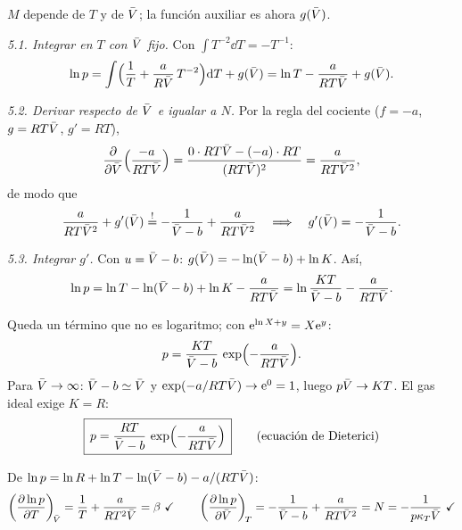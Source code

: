 \begin{resolucion}
 $M$ depende de $T$ y de $\bar{V}$; la función auxiliar es ahora $g(\bar{V})$.

\emph{5.1. Integrar en $T$ con $\bar{V}$ fijo.} Con $\int T^{-2}\dd T=-T^{-1}$:
\[
  \ln p=\int\Bigl(\frac1T+\frac{a}{R\bar{V}}\,T^{-2}\Bigr)\mathrm{d} T+g(\bar{V})=\ln T-\frac{a}{RT\bar{V}}+g(\bar{V}).
\]

\emph{5.2. Derivar respecto de $\bar{V}$ e igualar a $N$.} Por la regla del cociente ($f=-a$, $g=RT\bar{V}$,
$g'=RT$),
\[
  \frac{\partial}{\partial\bar{V}}\Bigl(\frac{-a}{RT\bar{V}}\Bigr)=\frac{0\cdot RT\bar{V}-(-a)\cdot RT}{(RT\bar{V})^2}=\frac{a}{RT\bar{V}^2},
\]
de modo que
\[
  \frac{a}{RT\bar{V}^2}+g'(\bar{V})\stackrel{!}{=}-\frac{1}{\bar{V}-b}+\frac{a}{RT\bar{V}^2}
  \quad\Longrightarrow\quad g'(\bar{V})=-\frac{1}{\bar{V}-b}.
\]

\emph{5.3. Integrar $g'$.} Con $u=\bar{V}-b$: $g(\bar{V})=-\ln(\bar{V}-b)+\ln K$. Así,
\[
  \ln p=\ln T-\ln(\bar{V}-b)+\ln K-\frac{a}{RT\bar{V}}=\ln\frac{KT}{\bar{V}-b}-\frac{a}{RT\bar{V}}.
\]

 Queda un término que no es logaritmo; con
$\mathrm{e}^{\ln X+y}=X\mathrm{e}^y$:
\[
  p=\frac{KT}{\bar{V}-b}\,\exp\Bigl(-\frac{a}{RT\bar{V}}\Bigr).
\]
Para $\bar{V}\to\infty$: $\bar{V}-b\simeq\bar{V}$ y $\exp(-a/RT\bar{V})\to\mathrm{e}^0=1$, luego $p\bar{V}\to KT$. El gas ideal exige
$K=R$:
\[
  \boxed{\,p=\frac{RT}{\bar{V}-b}\,\exp\Bigl(-\frac{a}{RT\bar{V}}\Bigr)\,}\qquad\text{(ecuación de Dieterici)}
\]

 De $\ln p=\ln R+\ln T-\ln(\bar{V}-b)-a/(RT\bar{V})$:
\[
  \left(\frac{\partial \ln p}{\partial T}\right)_{\!\bar{V}}=\frac1T+\frac{a}{RT^2\bar{V}}=\beta\ \checkmark\qquad
  \left(\frac{\partial \ln p}{\partial \bar{V}}\right)_{\!T}=-\frac{1}{\bar{V}-b}+\frac{a}{RT\bar{V}^2}=N=-\frac{1}{p\kappa_T\bar{V}}\ \checkmark
\]
\end{resolucion}

